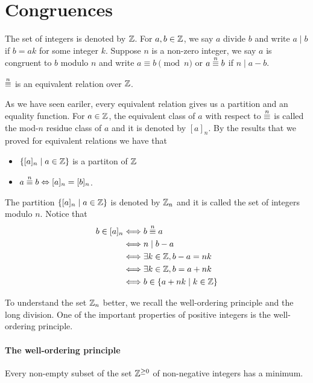 \section{Congruences}


The set of integers is denoted by $\mathbb{Z}$. For $a,b\in\mathbb{Z}$,
we say $a$ divide $b$ and write $a\mid b$ if $b=ak$ for some
integer $k$. Suppose $n$ is a non-zero integer, we say
$a$ is congruent to $b$ modulo $n$ and write $a\equiv b\pmod n$
or $a\overset{n}{\equiv} b$ if $n\mid a-b$.

\begin{lemma}
    $\overset{n}{\equiv}$ is an equivalent relation over $\mathbb{Z}$.
\end{lemma}

As we have seen eariler, every equivalent relation
gives us a partition and an equality function.
For $a\in\mathbb{Z}$, the equivalent class of $a$ with respect
to $\overset{n}{\equiv}$ is called the mod-$n$ residue class of $a$
and it is denoted by $[a]_n$. By the results that we 
proved for equivalent relations we have that
\begin{itemize}
    \item $\{[a]_n\mid a\in\mathbb{Z}\}$ is a partiton of $\mathbb{Z}$
    \item $a\overset{n}{\equiv} b\Leftrightarrow [a]_n=[b]_n$.
\end{itemize}

The partition $\{[a]_n\mid a\in\mathbb{Z}\}$ is denoted by $\mathbb{Z}_n$
and it is called the set of integers modulo $n$.
Notice that
\[\begin{split}
    b\in[a]_n
    &\Longleftrightarrow b\overset{n}{\equiv} a\\
    &\Longleftrightarrow n\mid b-a\\
    &\Longleftrightarrow \exists k\in\mathbb{Z},b-a=nk\\
    &\Longleftrightarrow \exists k\in\mathbb{Z},b=a+nk\\
    &\Longleftrightarrow b\in\{a+nk\mid k\in\mathbb{Z}\}
\end{split}\]

To understand the set $\mathbb{Z}_n$ better,
we recall the well-ordering principle and
the long division. One of the important properties
of positive integers is the well-ordering principle.

\paragraph{The well-ordering principle}
Every non-empty subset of the set $\mathbb{Z}^{\geq 0}$
of non-negative integers has a minimum.

